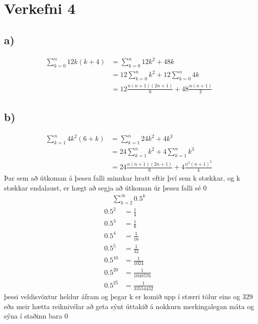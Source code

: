 \documentclass{article}
\begin{document}
\newpage
\section*{Verkefni 4}
\subsection*{a)}
\begin{align*}
    \sum_{k=0}^{n}12k(k+4)&=\sum_{k=0}^{n}12k^2+48k\\
    &=12\sum_{k=0}^{n}k^2+12\sum_{k=0}^{n}4k\\
    &=12\frac{n(n+1)(2n+1)}{6}+48\frac{n(n+1)}{2}
\end{align*}
\subsection*{b)}
\begin{align*}
    \sum_{k=1}^{n}4k^2(6+k)&=\sum_{k=1}^{n}24k^2+4k^3\\
    &=24\sum_{k=1}^{n}k^2+4\sum_{k=1}^{n}k^3\\
    &=24\frac{n(n+1)(2n+1)}{6}+4\frac{n^2(n+1)^2}{4}
\end{align*}
Þar sem að útkoman á þessu falli minnkar hratt eftir því sem k stækkar, og k stækkar endalaust, er hægt að segja að útkoman úr þessu falli sé 0
\begin{align*}
    \sum_{k=2}^\infty0.5^k
\end{align*}
\begin{align*}
    0.5^2&=\frac{1}{4}\\
    0.5^3&=\frac{1}{8}\\
    0.5^4&=\frac{1}{16}\\
    0.5^5&=\frac{1}{32}\\
    0.5^{10}&=\frac{1}{1024}\\
    0.5^{20}&=\frac{1}{1048576}\\
    0.5^{25}&=\frac{1}{33554432}
\end{align*}
þessi veldisvöxtur heldur áfram og þegar k er komið upp í stærri tölur eins og 329 eða meir hætta reiknivélar að geta sýnt úttakið á nokkurn merkingalegan máta og sýna í staðinn bara 0
\end{document}
